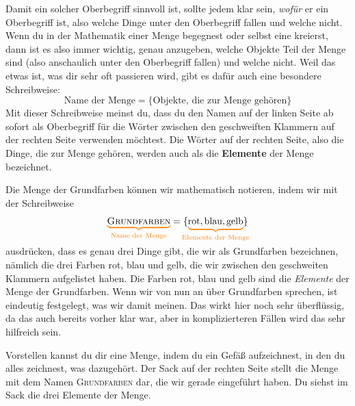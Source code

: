 \documentclass[../../main.tex]{subfiles}
\begin{document}
Damit ein solcher Oberbegriff sinnvoll ist, sollte jedem klar sein, \emph{wofür} er ein Oberbegriff ist, also welche Dinge unter den Oberbegriff fallen und welche nicht. Wenn du in der Mathematik einer Menge begegnest oder selbst eine kreierst, dann ist es also immer wichtig, genau anzugeben, welche Objekte Teil der Menge sind (also anschaulich unter den Oberbegriff fallen) und welche nicht. Weil das etwas ist, was dir sehr oft passieren wird, gibt es dafür auch eine besondere Schreibweise:
\[\text{Name der Menge}=\{\text{Objekte, die zur Menge gehören}\}\]
Mit dieser Schreibweise meinst du, dass du den Namen auf der linken Seite ab sofort als Oberbegriff für die Wörter zwischen den geschweiften Klammern auf der rechten Seite verwenden möchtest. Die Wörter auf der rechten Seite, also die Dinge, die zur Menge gehören, werden auch als die \textbf{Elemente} der Menge bezeichnet.

\begin{example}{}

    Die Menge der Grundfarben können wir mathematisch notieren, indem wir mit der Schreibweise
    \[\colorbrace{\textsc{Grundfarben}}{\text{Name der Menge}}=\{\colorbrace{\text{rot},\text{blau},\text{gelb}}{\text{Elemente der Menge}}\}\]
    ausdrücken, dass es genau drei Dinge gibt, die wir als Grundfarben bezeichnen, nämlich die drei Farben rot, blau und gelb, die wir zwischen den geschweiten Klammern aufgelistet haben. Die Farben rot, blau und gelb sind die \emph{Elemente} der Menge der Grundfarben. Wenn wir von nun an über Grundfarben sprechen, ist eindeutig festgelegt, was wir damit meinen. Das wirkt hier noch sehr überflüssig, da das auch bereits vorher klar war, aber in komplizierteren Fällen wird das sehr hilfreich sein.

    Vorstellen kannst du dir eine Menge, indem du ein Gefäß aufzeichnest, in den du alles zeichnest, was dazugehört. Der Sack auf der rechten Seite stellt die Menge mit dem Namen \textsc{Grundfarben} dar, die wir gerade eingeführt haben. Du siehst im Sack die drei Elemente der Menge.
\end{example}
\end{document}
